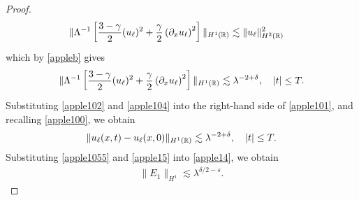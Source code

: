 \begin{proof}
\begin{equation*}
\begin{split}
\|\Lambda^{-1} \left[ \frac{3-\gamma}{2}(u_\ell)^2 +
\frac{\gamma}{2}\left( \partial_x u_\ell \right)^2 \right] \|_{H^1(\mathbb{R})}
& \lesssim \|u_\ell\|_{H^2(\mathbb{R})}^2
\end{split}
\end{equation*}
%
%
which by \cref{appleb} gives
%
%
\begin{equation}
\begin{split}
\|\Lambda^{-1} \left[ \frac{3-\gamma}{2}(u_\ell)^2 +
\frac{\gamma}{2}\left( \partial_x u_\ell \right)^2 \right] \|_{H^1(\mathbb{R})}
\lesssim \lambda^{-2 + \delta}, \quad |t| \le T.
\label{apple104}
\end{split}
\end{equation}
%
%
Substituting \eqref{apple102} and \eqref{apple104} into the right-hand side 
of
\eqref{apple101}, and recalling \eqref{apple100}, we obtain
%
%
\begin{equation}
\begin{split}
\|u_\ell(x,t) - u_\ell(x,0)\|_{H^1(\mathbb{R})} \lesssim \lambda^{-2 + \delta}, 
\quad |t| \le T.
\label{apple1055}
\end{split}
\end{equation}
%
Substituting \eqref{apple1055} and \eqref{apple15} into \eqref{apple14}, we obtain
%
%
\begin{equation}
  \label{apple105}
\begin{split}
  \| E_{1} \|_{H^{1}} \lesssim \lambda^{\delta/2 -s}.
\end{split}
\end{equation}
%
%


\end{proof}
